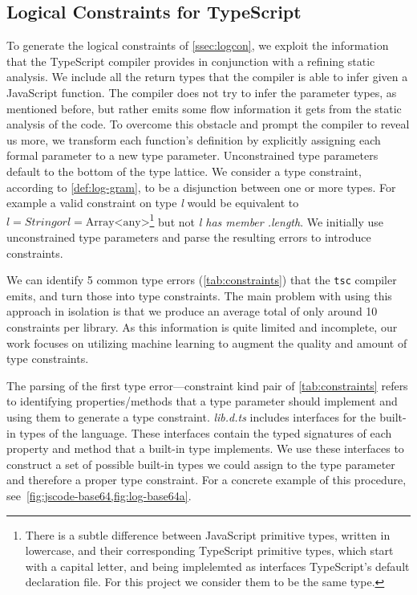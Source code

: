 \documentclass[sigplan,10pt,anonymous]{acmart} %
\theoremstyle{plain}
\theoremstyle{remark}
\theoremstyle{definition}
\begin{document}
\subsection{Logical Constraints for TypeScript}\label{ssec:logprodts}
To generate the logical constraints of \cref{ssec:logcon},
we exploit the information that the TypeScript
compiler provides \cite{typescript} in conjunction with a refining static
analysis. We include all the return types that the
compiler is able to infer given a JavaScript function. The compiler does
not try to infer the parameter types, as mentioned before, but rather emits
some flow information it gets from the static analysis of the code.
To overcome this obstacle and prompt the compiler to reveal us more,
we transform each function's definition by
explicitly assigning each formal parameter to a new type parameter.
Unconstrained type parameters default to the bottom
of the type lattice. We consider a type constraint, according
to \cref{def:log-gram}, to be a disjunction between
one or more types. For example a valid constraint on type \textit{l} would be equivalent to
$l = String \mathrel{or} l = \text{Array<any>}$\footnote{There is a subtle difference between JavaScript primitive types, written in lowercase, and their corresponding TypeScript primitive types, which start with a capital letter, and being implelemted as interfaces TypeScript's default declaration file. For this project we consider them to be the same type.} but not \textit{l has member .length}.
We initially use unconstrained type parameters and parse the resulting errors to
introduce constraints.

We can identify 5 common type errors (\cref{tab:constraints}) that the \texttt{tsc}
compiler emits, and turn those into type constraints. The main problem with using
this approach in isolation is that we produce an average total
of only around 10 constraints per library. As this information is quite
limited and incomplete, our work focuses on utilizing machine learning to augment
the quality and amount of type constraints.

The parsing of the first type error---constraint kind pair of \cref{tab:constraints}
refers to identifying properties/methods that a type parameter should implement
and using them to generate a type constraint.
\textit{lib.d.ts} includes interfaces for the built-in types of the language.
These interfaces contain the typed signatures of each property and method
that a built-in type implements. We use these interfaces to construct a set of
possible built-in types we could assign to the type parameter and therefore a proper
type constraint. For a concrete example of this procedure,
see~\cref{fig:jscode-base64,fig:log-base64a}.
\end{document}
